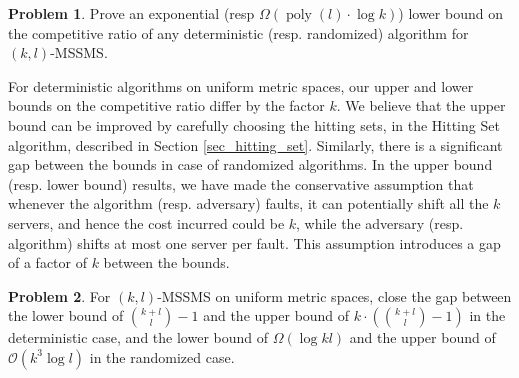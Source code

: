\documentclass[11pt]{article}
\theoremstyle{plain}\newtheorem{theorem}{Theorem}
\theoremstyle{definition}
\newtheorem{problem}{Problem}
\theoremstyle{remark}
\DeclareMathOperator{\poly}{poly}
\begin{document}
\begin{problem}
Prove an exponential (resp $\Omega(\poly(l)\cdot\log k)$) lower bound on the competitive ratio of any deterministic (resp. randomized) algorithm for $(k,l)$-MSSMS.
\end{problem}

For deterministic algorithms on uniform metric spaces, our upper and lower bounds on the competitive ratio differ by the factor $k$. We believe that the upper bound can be improved by carefully choosing the hitting sets, in the Hitting Set algorithm, described in Section \ref{sec_hitting_set}. Similarly, there is a significant gap between the 
bounds in case of randomized algorithms. In the upper bound (resp. lower bound) results, we have made the conservative assumption that whenever the algorithm (resp. adversary) faults, it can potentially shift all the $k$ servers, and hence the cost incurred could be $k$, while the adversary (resp. algorithm) shifts at most one server per fault. This assumption introduces a gap of a factor of $k$ between the bounds. 

\begin{problem}
For $(k,l)$-MSSMS on uniform metric spaces, close the gap between the lower bound of ${{k+l}\choose{l}}-1$ and the upper bound of $k\cdot\left({{k+l}\choose{l}}-1\right)$ in the deterministic case, and the lower bound of $\Omega(\log kl)$ and the upper bound of $\mathcal{O}(k^3\log l)$ in the randomized case.
\end{problem}



\end{document}
